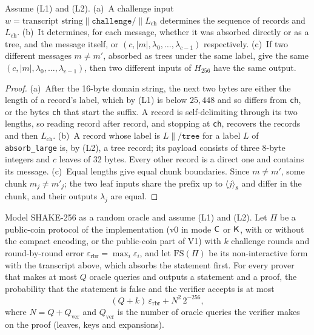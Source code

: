 \begin{lemma}
\label{lem:tree-dec}
Assume (L1) and (L2). (a)~A challenge input
$w=\text{transcript string}\|\texttt{challenge/}\|L_{\mathrm{ch}}$ determines the sequence of
records and $L_{\mathrm{ch}}$. (b)~It determines, for each message, whether it was absorbed directly
or as a tree, and the message itself, or $(c,|m|,\lambda_0,\dots,\lambda_{c-1})$ respectively.
(c)~If two different messages $m\neq m'$, absorbed as trees under the same label, give the same
$(c,|m|,\lambda_0,\dots,\lambda_{c-1})$, then two different inputs of $H_{256}$ have the same
output.
\end{lemma}

\begin{proof}
(a)~After the 16-byte domain string, the next two bytes are either the length of a record's label,
which by (L1) is below $25{,}448$ and so differs from \texttt{ch}, or the bytes \texttt{ch} that start
the suffix. A record is self-delimiting through its two lengths, so reading record after record,
and stopping at \texttt{ch}, recovers the records and then $L_{\mathrm{ch}}$.
(b)~A record whose label is $L\|\texttt{/tree}$ for a label $L$ of \texttt{absorb\_large} is, by (L2),
a tree record; its payload consists of three 8-byte integers and $c$ leaves of 32 bytes. Every other
record is a direct one and contains its message.
(c)~Equal lengths give equal chunk boundaries. Since $m\neq m'$, some chunk $m_j\neq m'_j$; the two
leaf inputs share the prefix up to $\langle j\rangle_8$ and differ in the chunk, and their outputs
$\lambda_j$ are equal.
\end{proof}

\begin{theorem}
\label{thm:fstree}
Model SHAKE-256 as a random oracle and assume (L1) and (L2). Let $\Pi$ be a public-coin protocol of
the implementation (v0 in mode $\mathsf{C}$ or $\mathsf{K}$, with or without the compact encoding, or the
public-coin part of V1) with $k$ challenge rounds and round-by-round error
$\varepsilon_{\mathrm{rbr}}=\max_i\varepsilon_i$, and let $\mathrm{FS}(\Pi)$ be its non-interactive
form with the transcript above, which absorbs the statement first. For every prover that makes at
most $Q$ oracle queries and outputs a statement and a proof, the probability that the statement is
false and the verifier accepts is at most
\[
  (Q+k)\,\varepsilon_{\mathrm{rbr}}+N^2\,2^{-256},
\]
where $N=Q+Q_{\mathrm{ver}}$ and $Q_{\mathrm{ver}}$ is the number of oracle queries the verifier
makes on the proof (leaves, keys and expansions).
\end{theorem}

